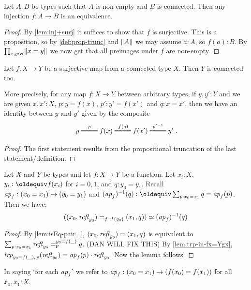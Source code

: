 \begin{definition}
\begin{corollary}\label{cor:inj+connected}
Let $A,B$ be types such that $A$ is non-empty and $B$ is connected.
Then any injection $f: A\to B$ is an equivalence.
\end{corollary}
\begin{proof}
By \cref{lem:inj+surj} it suffices to show that $f$ is surjective.
This is a proposition, so by \cref{def:prop-trunc} and $\lVert A\rVert$
we may assume $a:A$, so $f(a):B$. By $\prod_{x,y:B} \lVert x=y\rVert$
we now get that all preimages under $f$ are non-empty.
\end{proof}
\begin{lemma}
  \label{lem:whenisbasespaceconnected}
  Let $f:X\to Y$ be a surjective map from a connected type $X$. Then $Y$ is connected too.  

More precisely, for any map $f:X\to Y$ between arbitrary types, if $y,y':Y$ and we are given $x,x':X$, $p:y=f(x)$, $p':y'=f(x')$ and $q:x=x'$, then we have an identity between $y$ and $y'$ given by the composite
$$\xymatrix{y\ar@{=}[r]^-p&f(x)\ar@{=}[r]^{f(q)}&f(x')\ar@{=}[r]^-{p'{}^{-1}}&y'}.$$
\end{lemma}
\begin{proof}
  The first statement results from the propositional truncation of the last statement/definition.
\end{proof}

\begin{lemma}\label{lem:fib-vs-path}
Let $X$ and $Y$ be types and let $f:X\to Y$ be a function.
Let $x_i:X$, $y_i\defeq f(x_i)$ for $i=0,1$, and $q:y_0 = y_1$.
Recall $\mathop{{\it ap}_{f}}: (x_0=x_1) \to (y_0 = y_1)$ and
$(\ap{f})^{-1}(q) \defeq \sum_{p:x_0=x_1} q =\ap{f}(p)$.
Then we have:
\[
((x_0,\mathop{{\it refl}_{y_0}})=_{f^{-1}(y_0)}(x_1,q))\simeq (\mathop{{\it ap}_{f}})^{-1}(q)
\]
\end{lemma}
\begin{proof}
By \cref{lem:isEq-pair=},
$(x_0,\mathop{{\it refl}_{y_0}})=(x_1,q)$ is equivalent to
$\sum_{p:x_0=x_1} \mathop{{\it refl}_{y_0}} =^{y_0=f(\_)}_{p} q$.
(DAN WILL FIX THIS)
By \cref{lem:trp-in-fx=Ygx}, $\mathop{\mathit{trp}_{y_0=f(\_),\,p}}(\mathop{{\it refl}_{y_0}}) =
\mathop{{\it ap}_{f}}(p) \cdot \mathop{{\it refl}_{y_0}}$. Now the lemma follows.
\end{proof}

In saying `for each $\mathop{{\it ap}_{f}}$' we refer to
$\mathop{{\it ap}_{f}}: (x_0=x_1) \to (f(x_0)=f(x_1))$ for all $x_0,x_1:X$.


\end{definition}

